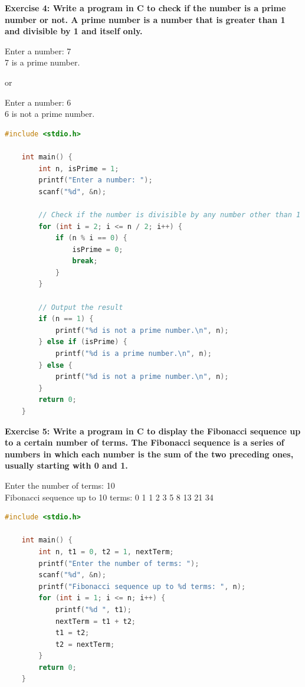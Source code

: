 \documentclass[12pt, openany]{book}
\begin{document}
\noindent\textbf{Exercise 4: Write a program in C to check if the number is a prime number or not. A prime number is a number that is greater than 1 and divisible by 1 and itself only.}
\begin{tcolorbox}[colback=lightgray!10, colframe=black, title=Example Output]
    Enter a number: 7 \\
    7 is a prime number.
\end{tcolorbox}
or
\begin{tcolorbox}[colback=lightgray!10, colframe=black, title=Example Output]
    Enter a number: 6 \\
    6 is not a prime number.
\end{tcolorbox}

\begin{lstlisting}[language=C, gobble=0, caption=Solution to Exercise 4]
    #include <stdio.h>
    
    int main() {
        int n, isPrime = 1;
        printf("Enter a number: ");
        scanf("%d", &n);

        // Check if the number is divisible by any number other than 1 and itself
        for (int i = 2; i <= n / 2; i++) {
            if (n % i == 0) {
                isPrime = 0;
                break;
            }
        }

        // Output the result
        if (n == 1) {
            printf("%d is not a prime number.\n", n);
        } else if (isPrime) {
            printf("%d is a prime number.\n", n);
        } else {
            printf("%d is not a prime number.\n", n);
        }
        return 0;
    }
\end{lstlisting}

\noindent\textbf{Exercise 5: Write a program in C to display the Fibonacci sequence up to a certain number of terms. The Fibonacci sequence is a series of numbers in which each number is the sum of the two preceding ones, usually starting with 0 and 1.}
\begin{tcolorbox}[colback=lightgray!10, colframe=black, title=Example Output]
    Enter the number of terms: 10 \\
    Fibonacci sequence up to 10 terms: 0 1 1 2 3 5 8 13 21 34
\end{tcolorbox}

\begin{lstlisting}[language=C, gobble=0, caption=Solution to Exercise 5]
    #include <stdio.h>
    
    int main() {
        int n, t1 = 0, t2 = 1, nextTerm;
        printf("Enter the number of terms: ");
        scanf("%d", &n);
        printf("Fibonacci sequence up to %d terms: ", n);
        for (int i = 1; i <= n; i++) {
            printf("%d ", t1);
            nextTerm = t1 + t2;
            t1 = t2;
            t2 = nextTerm;
        }
        return 0;
    }
\end{lstlisting}
\end{document}
